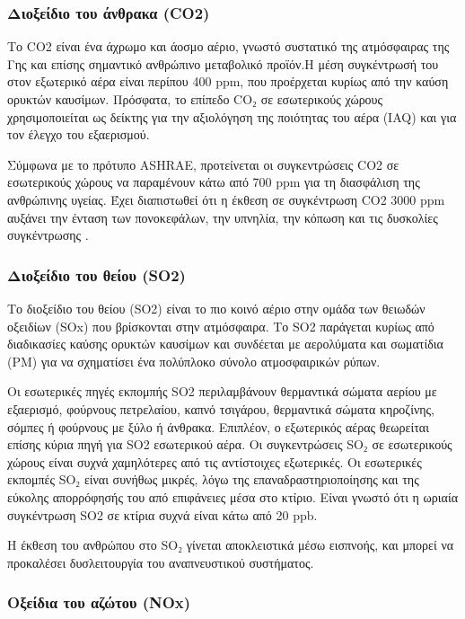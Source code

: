 \subsubsection{Διοξείδιο του άνθρακα (CO2)}
Το CO2 είναι ένα άχρωμο και άοσμο αέριο, γνωστό συστατικό της ατμόσφαιρας της Γης και επίσης σημαντικό ανθρώπινο μεταβολικό προϊόν.Η μέση συγκέντρωσή του στον εξωτερικό αέρα είναι περίπου 400 ppm, που προέρχεται κυρίως από την καύση ορυκτών καυσίμων. 
Πρόσφατα, το επίπεδο CO₂ σε εσωτερικούς χώρους χρησιμοποιείται ως δείκτης για την αξιολόγηση της ποιότητας του αέρα (IAQ) και για τον έλεγχο του εξαερισμού. 

Σύμφωνα με το πρότυπο ASHRAE, προτείνεται οι συγκεντρώσεις CO2 σε εσωτερικούς χώρους να παραμένουν κάτω από 700 ppm για τη διασφάλιση της ανθρώπινης υγείας.
 Έχει διαπιστωθεί ότι η έκθεση σε συγκέντρωση CO2 3000 ppm αυξάνει την ένταση των πονοκεφάλων, την υπνηλία, την κόπωση και τις δυσκολίες συγκέντρωσης \cite{ijerph17082927}.



\subsubsection{Διοξείδιο του θείου (SO2)}

Το διοξείδιο του θείου (SO2) είναι το πιο κοινό αέριο στην ομάδα των θειωδών οξειδίων (SOx) που βρίσκονται στην ατμόσφαιρα.
Το SO2 παράγεται κυρίως από διαδικασίες καύσης ορυκτών καυσίμων και συνδέεται με αερολύματα και σωματίδια (PM) για να σχηματίσει ένα πολύπλοκο σύνολο ατμοσφαιρικών ρύπων.

Οι εσωτερικές πηγές εκπομπής SO2 περιλαμβάνουν θερμαντικά σώματα αερίου με εξαερισμό, φούρνους πετρελαίου, καπνό τσιγάρου, θερμαντικά σώματα κηροζίνης, σόμπες ή φούρνους με ξύλο ή άνθρακα.
Επιπλέον, ο εξωτερικός αέρας θεωρείται επίσης κύρια πηγή για SO2 εσωτερικού  αέρα. Οι συγκεντρώσεις SO₂ σε εσωτερικούς χώρους είναι συχνά χαμηλότερες από τις αντίστοιχες εξωτερικές. Οι εσωτερικές εκπομπές SO₂ είναι συνήθως μικρές, 
λόγω της επαναδραστηριοποίησης και της εύκολης απορρόφησής του από επιφάνειες μέσα στο κτίριο. Είναι γνωστό ότι η ωριαία συγκέντρωση SO2 σε κτίρια συχνά είναι κάτω από 20 ppb.

Η έκθεση του ανθρώπου στο SO₂ γίνεται αποκλειστικά μέσω εισπνοής, και μπορεί να προκαλέσει δυσλειτουργία του αναπνευστικού συστήματος.

\cite{ijerph17082927}


\subsubsection{Οξείδια του αζώτου (NOx)}

